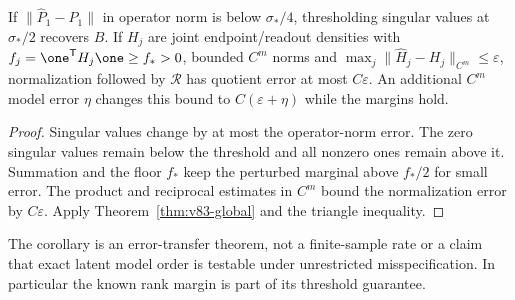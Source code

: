 \begin{corollary}\label{cor:v83-error}
If $\|\widehat P_1-P_1\|$ in operator norm is below $\sigma_*/4$,
thresholding singular values at $\sigma_*/2$ recovers $B$. If
$H_j$ are joint endpoint/readout densities with
$f_j=\one^{\mathsf T}H_j\one\ge f_*>0$, bounded $C^m$ norms and
$\max_j\|\widehat H_j-H_j\|_{C^m}\le\varepsilon$, normalization
followed by $\mathcal R$ has quotient error at most $C\varepsilon$.
An additional $C^m$ model error $\eta$ changes this bound to
$C(\varepsilon+\eta)$ while the margins hold.
\end{corollary}
\begin{proof}
Singular values change by at most the operator-norm error. The zero
singular values remain below the threshold and all nonzero ones remain
above it. Summation and the floor $f_*$ keep the perturbed marginal
above $f_*/2$ for small error. The product and reciprocal estimates
in $C^m$ bound the normalization error by $C\varepsilon$.
Apply Theorem~\ref{thm:v83-global} and the triangle inequality.
\end{proof}

The corollary is an error-transfer theorem, not a finite-sample rate
or a claim that exact latent model order is testable under unrestricted
misspecification. In particular the known rank margin is part of its
threshold guarantee.
